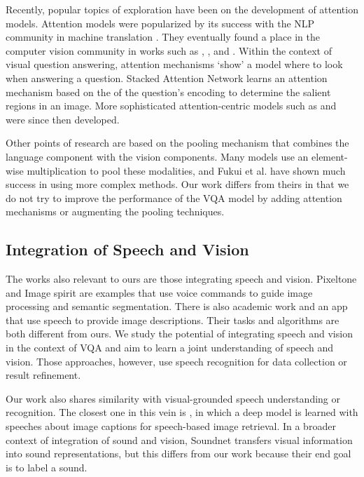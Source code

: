\documentclass[letterpaper]{article} %
\begin{document}
Recently, popular topics of exploration have been on the development of attention models. Attention models were popularized by its success with the NLP community in machine translation \cite{nmt:joint:align}. They eventually found a place in the computer vision community in works such as \cite{recurrent:visual:attn}, \cite{dnn:selective:attn}, and \cite{show:attend:tell}. Within the context of visual question answering, attention mechanisms `show' a model where to look when answering a question. Stacked Attention Network \cite{vqa:stackedattn} learns an attention mechanism based on the of the question's encoding to determine the salient regions in an image. More sophisticated attention-centric models such as \cite{vqa:dualattn,vqa:hieco} and \cite{vqa:dynamicmemory} were since then developed.

Other points of research are based on the pooling mechanism that combines the language component with the vision components. Many models \cite{vqa:spatial:attn} \cite{vqa:simp} \cite{vqa:stackedattn} use an element-wise multiplication to pool these modalities, \cite{vqa:hieco} and Fukui et al. \cite{multimodal:pooling} have shown much success in using more complex methods. Our work differs from theirs in that we do not try to improve the performance of the VQA model by adding attention mechanisms or augmenting the pooling techniques.


\subsection{Integration of Speech and Vision}
The works also relevant to ours are those integrating speech and vision. Pixeltone \cite{pixel:tone}
and Image spirit \cite{image:spirit} are examples that use voice
commands to guide image processing and semantic segmentation. There is also academic work \cite{show:tell} \cite{speech:anno:img} \cite{speech:retri:img} and an app \cite{smile} that use speech to provide image descriptions. Their tasks and algorithms are both different from ours. We study the potential of integrating speech and vision in the context of VQA and aim to learn a joint understanding of speech and vision. Those approaches, however, use speech recognition for data collection or result refinement.

Our work also shares similarity with visual-grounded speech understanding or recognition. The closest one in this vein is \cite{speech:caption}, in which a deep model is learned with speeches about image captions for speech-based image retrieval. In a broader context of integration of sound and vision, Soundnet \cite{soundnet} transfers visual information into sound representations, but this differs from our work because their end goal is to label a sound.
\end{document}
